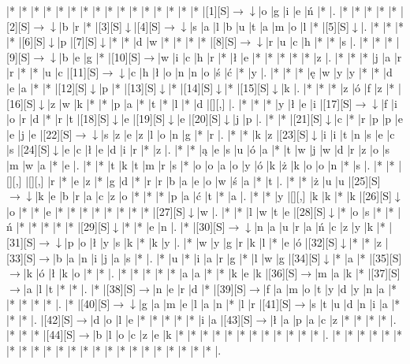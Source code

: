 \documentclass[11pt]{article}
\newcommand\drarr{$\rightarrow \!\!\!\!\! \downarrow$}
\newcommand\rarr{$\rightarrow$}
\newcommand\darr{$\downarrow$}
\begin{document}
\noindent\begin{Puzzle}{22}{24}|*	|*	|*	|*	|*	|*	|*	|*	|*	|*	|*	|*	|*	|*	|*	|*	|[1][S]\drarr	|o	|g	|i	|e	|ń	|*	|.
|*	|*	|*	|*	|*	|[2][S]\drarr	|b	|r	|*	|[3][S]\darr	|[4][S]\drarr	|s	|a	|l	|b	|u	|t	|a	|m	|o	|l	|*	|[5][S]\darr	|.
|*	|*	|*	|*	|[6][S]\darr	|p	|[7][S]\darr	|*	|*	|d	|w	|*	|*	|*	|*	|[8][S]\drarr	|r	|u	|c	|h	|*	|*	|s	|.
|*	|*	|*	|[9][S]\drarr	|b	|e	|g	|*	|[10][S]\rarr	|w	|i	|c	|h	|r	|*	|ł	|e	|*	|*	|*	|*	|*	|z	|.
|*	|*	|*	|j	|a	|r	|r	|*	|*	|u	|c	|[11][S]\drarr	|c	|h	|ł	|o	|n	|n	|o	|ś	|ć	|*	|y	|.
|*	|*	|*	|ę	|w	|y	|y	|*	|*	|d	|e	|a	|*	|*	|[12][S]\darr	|p	|*	|[13][S]\darr	|*	|[14][S]\darr	|*	|[15][S]\darr	|k	|.
|*	|*	|*	|z	|ó	|f	|z	|*	|[16][S]\darr	|z	|w	|k	|*	|*	|p	|a	|*	|t	|*	|l	|*	|d	|[][,]{ }	|.
|*	|*	|*	|y	|ł	|e	|i	|[17][S]\drarr	|f	|i	|o	|r	|d	|*	|r	|t	|[18][S]\darr	|e	|[19][S]\darr	|e	|[20][S]\darr	|j	|p	|.
|*	|*	|[21][S]\darr	|c	|*	|r	|p	|p	|e	|e	|j	|e	|[22][S]\drarr	|s	|z	|e	|z	|l	|o	|n	|g	|*	|r	|.
|*	|*	|k	|z	|[23][S]\darr	|i	|i	|t	|n	|s	|e	|c	|s	|[24][S]\darr	|e	|c	|ł	|e	|d	|i	|r	|*	|z	|.
|*	|*	|ą	|e	|s	|u	|ó	|a	|*	|t	|w	|j	|w	|d	|r	|z	|o	|s	|m	|w	|a	|*	|e	|.
|*	|*	|t	|k	|t	|m	|r	|s	|*	|o	|o	|a	|o	|y	|ó	|k	|ż	|k	|o	|o	|n	|*	|s	|.
|*	|*	|[][,]{ }	|[][,]{ }	|r	|*	|e	|z	|*	|g	|d	|*	|r	|r	|b	|a	|e	|o	|w	|ś	|a	|*	|t	|.
|*	|*	|ż	|u	|u	|[25][S]\drarr	|k	|e	|b	|r	|a	|c	|z	|o	|*	|*	|*	|p	|a	|ć	|t	|*	|a	|.
|*	|*	|y	|[][,]{ }	|k	|k	|*	|k	|[26][S]\darr	|o	|*	|*	|e	|*	|*	|*	|*	|*	|*	|*	|*	|[27][S]\darr	|w	|.
|*	|*	|l	|w	|t	|e	|[28][S]\darr	|*	|o	|s	|*	|*	|ń	|*	|*	|*	|*	|*	|[29][S]\darr	|*	|*	|e	|n	|.
|*	|[30][S]\drarr	|n	|a	|u	|r	|a	|ń	|c	|z	|y	|k	|*	|[31][S]\drarr	|p	|o	|ł	|y	|s	|k	|*	|k	|y	|.
|*	|w	|y	|g	|r	|k	|l	|*	|e	|ó	|[32][S]\darr	|*	|*	|z	|[33][S]\rarr	|b	|a	|n	|i	|j	|a	|s	|*	|.
|*	|u	|*	|i	|a	|r	|g	|*	|l	|w	|g	|[34][S]\darr	|*	|a	|*	|[35][S]\rarr	|k	|ó	|ł	|k	|o	|*	|*	|.
|*	|*	|*	|*	|*	|a	|a	|*	|*	|k	|e	|k	|[36][S]\rarr	|m	|a	|k	|*	|[37][S]\rarr	|a	|l	|t	|*	|*	|.
|*	|[38][S]\rarr	|n	|e	|r	|d	|*	|[39][S]\rarr	|f	|a	|m	|o	|t	|y	|d	|y	|n	|a	|*	|*	|*	|*	|*	|.
|*	|[40][S]\drarr	|g	|a	|m	|e	|l	|a	|n	|*	|l	|r	|[41][S]\rarr	|s	|t	|u	|d	|n	|i	|a	|*	|*	|*	|.
|[42][S]\rarr	|d	|o	|l	|e	|*	|*	|*	|*	|*	|i	|a	|[43][S]\rarr	|ł	|a	|p	|a	|c	|z	|*	|*	|*	|*	|.
|*	|*	|*	|[44][S]\rarr	|b	|l	|o	|c	|z	|e	|k	|*	|*	|*	|*	|*	|*	|*	|*	|*	|*	|*	|*	|.
|*	|*	|*	|*	|*	|*	|*	|*	|*	|*	|*	|*	|*	|*	|*	|*	|*	|*	|*	|*	|*	|*	|*	|.\end{Puzzle}

\newpage
\end{document}
